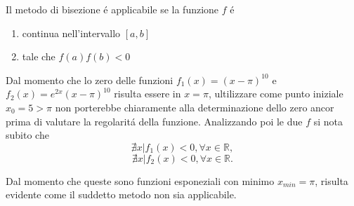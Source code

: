 Il metodo di bisezione \'e applicabile se la funzione \(f\) \'e
\begin{enumerate}

\item continua nell'intervallo \( [a,b] \)
\item tale che \( f(a)f(b)<0 \)

\end{enumerate}

Dal momento che lo zero delle funzioni \( f_1(x)=(x-\pi)^{10} \) e \( f_2(x)=e^{2x}(x-\pi)^{10} \) risulta essere in \( x=\pi \), ultilizzare come punto iniziale \( x_0 = 5 > \pi \) non porterebbe chiaramente alla determinazione dello zero ancor prima di valutare la regolarit\'a della funzione. 
Analizzando poi le due \( f \) si nota subito che \[
\nexists x | f_1(x)<0, \forall x \in \mathbb{R}, \]
\[
\nexists x | f_2(x)<0, \forall x \in \mathbb{R}.
\]


\begin {flushleft} Dal momento che queste sono funzioni esponeziali con minimo \(x_{min} = \pi \), risulta evidente come il suddetto metodo non sia applicabile. \end{flushleft}
 

